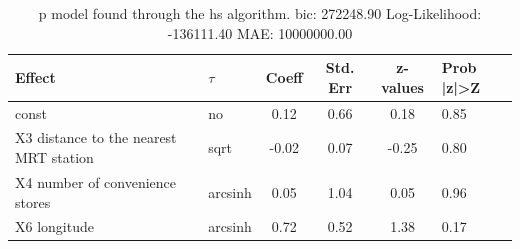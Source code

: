 \begin{table}
	\caption{p model found through the hs algorithm. bic: 272248.90 Log-Likelihood: -136111.40 MAE: 10000000.00}
	\begin{center}
		\begin{tabular}{|l|l|c|c|c|l|}
			\hline
			Effect & $\tau$ & Coeff & Std. Err & z-values & Prob |z|>Z \\
			\hline
			const & no & 0.12 & 0.66 & 0.18 & 0.85 \\
			\hline
			X3 distance to the nearest MRT station & sqrt & -0.02 & 0.07 & -0.25 & 0.80 \\
			\hline
			X4 number of convenience stores & arcsinh & 0.05 & 1.04 & 0.05 & 0.96 \\
			\hline
			X6 longitude & arcsinh & 0.72 & 0.52 & 1.38 & 0.17 \\
			\hline
		\end{tabular}
	\end{center}
\end{table}